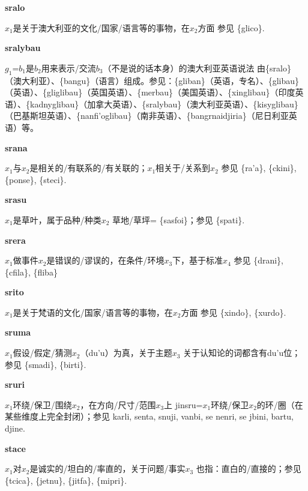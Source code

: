 \documentclass[notitlepage,twocolumn,a4paper,10pt]{book}
\begin{document}
{\sffamily\bfseries sralo} $x_1$是关于澳大利亚的文化\slash{}国家\slash{}语言等的事物，在$x_2$方面 \textemdash{} 参见 \{glico\}.

{\sffamily\bfseries sralybau} $g_1$=$b_1$是$b_2$用来表示\slash{}交流$b_3$（不是说的话本身）的澳大利亚英语说法 \textemdash{} 由\{sralo\}（澳大利亚）、\{bangu\}（语言）组成。参见：\{gliban\}（英语，专名）、\{glibau\}（英语）、\{gliglibau\}（英国英语）、\{merbau\}（美国英语）、\{xinglibau\}（印度英语）、\{kadnyglibau\}（加拿大英语）、\{sralybau\}（澳大利亚英语）、\{kisyglibau\}（巴基斯坦英语）、\{nanfi'oglibau\}（南非英语）、\{bangrnaidjiria\}（尼日利亚英语）等。

{\sffamily\bfseries srana}\enspace {\ttfamily\bfseries[        ra'a]}  $x_1$与$x_2$是相关的\slash{}有联系的\slash{}有关联的；$x_1$相关于\slash{}关系到$x_2$ \textemdash{} 参见 \{ra'a\}, \{ckini\}, \{ponse\}, \{steci\}.

{\sffamily\bfseries srasu}\enspace {\ttfamily\bfseries[sas]}  $x_1$是草叶，属于品种\slash{}种类$x_2$ \textemdash{} 草地\slash{}草坪= \{sasfoi\}；参见 \{spati\}.

{\sffamily\bfseries srera}\enspace {\ttfamily\bfseries[    sre]}  $x_1$做事件$x_2$是错误的\slash{}谬误的，在条件\slash{}环境$x_3$下，基于标准$x_4$ \textemdash{} 参见 \{drani\}, \{cfila\}, \{fliba\}

{\sffamily\bfseries srito} $x_1$是关于梵语的文化\slash{}国家\slash{}语言等的事物，在$x_2$方面 \textemdash{} 参见 \{xindo\}, \{xurdo\}.

{\sffamily\bfseries sruma}\enspace {\ttfamily\bfseries[        ru'a]}  $x_1$假设\slash{}假定\slash{}猜测$x_2$（du'u）为真，关于主题$x_3$ \textemdash{} 关于认知论的词都含有du'u位；参见 \{smadi\}, \{birti\}.

{\sffamily\bfseries sruri}  $x_1$环绕\slash{}保卫\slash{}围绕$x_2$，在方向\slash{}尺寸\slash{}范围$x_3$上 \textemdash{} {jinsru}=$x_1$环绕\slash{}保卫$x_2$的环\slash{}圈（在某些维度上完全封闭）；参见 {karli}, {senta}, {snuji}, {vanbi}, se {nenri}, se {jbini}, {bartu}, {djine}.

{\sffamily\bfseries stace}\enspace {\ttfamily\bfseries[sac]}  $x_1$对$x_2$是诚实的\slash{}坦白的\slash{}率直的，关于问题\slash{}事实$x_3$ \textemdash{} 也指：直白的\slash{}直接的；参见 \{tcica\}, \{jetnu\}, \{jitfa\}, \{mipri\}.
\end{document}
